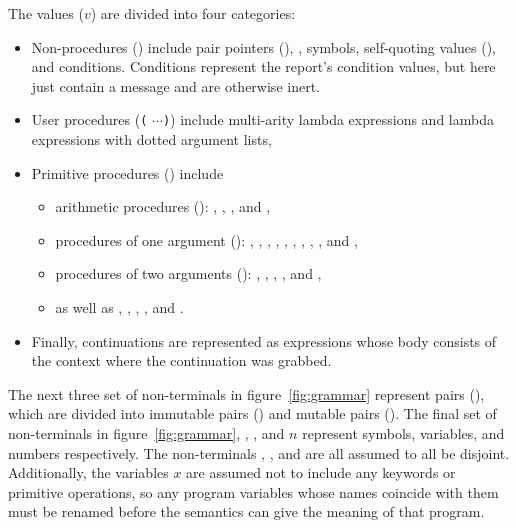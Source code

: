 The values ($v$) are divided into four categories:
%
\begin{itemize}
\item Non-procedures () include pair pointers
  (), , symbols, self-quoting values
  (), and conditions. Conditions represent
  the report's condition values, but here just contain a message and
  are otherwise inert.
\item User procedures (\texttt{(}    $\cdots$\texttt{)}) include multi-arity lambda expressions and lambda expressions with dotted argument lists,
\item Primitive procedures () include

\begin{itemize}
\item
 arithmetic procedures
  (): \va{+}, \va{-}, \va{/}, and \va{*}, 
\item 
  procedures of one
  argument (): , , , ,
  , , , , , and , 
  \item
  procedures of
  two arguments (): , , , ,
  and , 
  \item as well as , ,
  , , and .
\end{itemize}
\item Finally, continuations are represented as  expressions
  whose body consists of the context where the continuation was
  grabbed.
\end{itemize}
%
The next three set of non-terminals in figure~\ref{fig:grammar} represent pairs (), which are divided into immutable pairs () and mutable pairs (). The final set of non-terminals in figure~\ref{fig:grammar}, ,
, and $n$ represent symbols, variables, and
numbers respectively. The non-terminals , , and  are all assumed to all be disjoint. Additionally, the variables $x$ are assumed not to include any keywords or primitive operations, so any program variables whose names coincide with them must be renamed before the semantics can give the meaning of that program.

